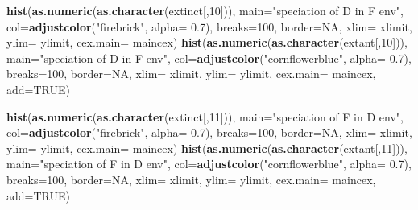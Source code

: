 \documentclass[]{book}
\newenvironment{Shaded}{\begin{snugshade}}{\end{snugshade}}
\newcommand{\KeywordTok}[1]{\textcolor[rgb]{0.13,0.29,0.53}{\textbf{{#1}}}}
\newcommand{\DataTypeTok}[1]{\textcolor[rgb]{0.13,0.29,0.53}{{#1}}}
\newcommand{\DecValTok}[1]{\textcolor[rgb]{0.00,0.00,0.81}{{#1}}}
\newcommand{\FloatTok}[1]{\textcolor[rgb]{0.00,0.00,0.81}{{#1}}}
\newcommand{\StringTok}[1]{\textcolor[rgb]{0.31,0.60,0.02}{{#1}}}
\newcommand{\OtherTok}[1]{\textcolor[rgb]{0.56,0.35,0.01}{{#1}}}
\newcommand{\NormalTok}[1]{{#1}}
\theoremstyle{definition}
\theoremstyle{definition}
\theoremstyle{remark}
\begin{document}
\begin{Shaded}
\begin{Highlighting}[]
\KeywordTok{hist}\NormalTok{(}\KeywordTok{as.numeric}\NormalTok{(}\KeywordTok{as.character}\NormalTok{(extinct[,}\DecValTok{10}\NormalTok{])), }\DataTypeTok{main=}\StringTok{"speciation of D in F env"}\NormalTok{, }\DataTypeTok{col=}\KeywordTok{adjustcolor}\NormalTok{(}\StringTok{"firebrick"}\NormalTok{, }\DataTypeTok{alpha=} \FloatTok{0.7}\NormalTok{), }\DataTypeTok{breaks=}\DecValTok{100}\NormalTok{, }\DataTypeTok{border=}\OtherTok{NA}\NormalTok{, }\DataTypeTok{xlim=}\NormalTok{ xlimit, }\DataTypeTok{ylim=}\NormalTok{ ylimit, }\DataTypeTok{cex.main=}\NormalTok{ maincex)}
\KeywordTok{hist}\NormalTok{(}\KeywordTok{as.numeric}\NormalTok{(}\KeywordTok{as.character}\NormalTok{(extant[,}\DecValTok{10}\NormalTok{])), }\DataTypeTok{main=}\StringTok{"speciation of D in F env"}\NormalTok{, }\DataTypeTok{col=}\KeywordTok{adjustcolor}\NormalTok{(}\StringTok{"cornflowerblue"}\NormalTok{, }\DataTypeTok{alpha=} \FloatTok{0.7}\NormalTok{), }\DataTypeTok{breaks=}\DecValTok{100}\NormalTok{, }\DataTypeTok{border=}\OtherTok{NA}\NormalTok{, }\DataTypeTok{xlim=}\NormalTok{ xlimit, }\DataTypeTok{ylim=}\NormalTok{ ylimit, }\DataTypeTok{cex.main=}\NormalTok{ maincex, }\DataTypeTok{add=}\OtherTok{TRUE}\NormalTok{)}


\KeywordTok{hist}\NormalTok{(}\KeywordTok{as.numeric}\NormalTok{(}\KeywordTok{as.character}\NormalTok{(extinct[,}\DecValTok{11}\NormalTok{])), }\DataTypeTok{main=}\StringTok{"speciation of F in D env"}\NormalTok{, }\DataTypeTok{col=}\KeywordTok{adjustcolor}\NormalTok{(}\StringTok{"firebrick"}\NormalTok{, }\DataTypeTok{alpha=} \FloatTok{0.7}\NormalTok{), }\DataTypeTok{breaks=}\DecValTok{100}\NormalTok{, }\DataTypeTok{border=}\OtherTok{NA}\NormalTok{, }\DataTypeTok{xlim=}\NormalTok{ xlimit, }\DataTypeTok{ylim=}\NormalTok{ ylimit, }\DataTypeTok{cex.main=}\NormalTok{ maincex)}
\KeywordTok{hist}\NormalTok{(}\KeywordTok{as.numeric}\NormalTok{(}\KeywordTok{as.character}\NormalTok{(extant[,}\DecValTok{11}\NormalTok{])), }\DataTypeTok{main=}\StringTok{"speciation of F in D env"}\NormalTok{, }\DataTypeTok{col=}\KeywordTok{adjustcolor}\NormalTok{(}\StringTok{"cornflowerblue"}\NormalTok{, }\DataTypeTok{alpha=} \FloatTok{0.7}\NormalTok{), }\DataTypeTok{breaks=}\DecValTok{100}\NormalTok{, }\DataTypeTok{border=}\OtherTok{NA}\NormalTok{, }\DataTypeTok{xlim=}\NormalTok{ xlimit, }\DataTypeTok{ylim=}\NormalTok{ ylimit, }\DataTypeTok{cex.main=}\NormalTok{ maincex, }\DataTypeTok{add=}\OtherTok{TRUE}\NormalTok{)}


\end{Highlighting}
\end{Shaded}
\end{document}

